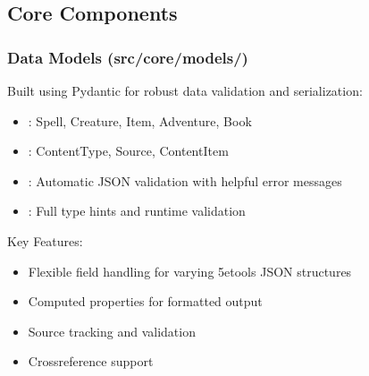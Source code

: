 \documentclass[letterpaper,10pt,english]{sphinxmanual}
\begin{document}
\subsection{Core Components}
\label{\detokenize{developer/architecture:core-components}}

\subsubsection{Data Models (src/core/models/)}
\label{\detokenize{developer/architecture:data-models-src-core-models}}
\sphinxAtStartPar
Built using Pydantic for robust data validation and serialization:
\begin{itemize}
\item {} 
\sphinxAtStartPar
{}: Spell, Creature, Item, Adventure, Book

\item {} 
\sphinxAtStartPar
{}: ContentType, Source, ContentItem

\item {} 
\sphinxAtStartPar
{}: Automatic JSON validation with helpful error messages

\item {} 
\sphinxAtStartPar
{}: Full type hints and runtime validation

\end{itemize}

\sphinxAtStartPar
Key Features:
\begin{itemize}
\item {} 
\sphinxAtStartPar
Flexible field handling for varying 5etools JSON structures

\item {} 
\sphinxAtStartPar
Computed properties for formatted output

\item {} 
\sphinxAtStartPar
Source tracking and validation

\item {} 
\sphinxAtStartPar
Cross\sphinxhyphen{}reference support

\end{itemize}
\end{document}
